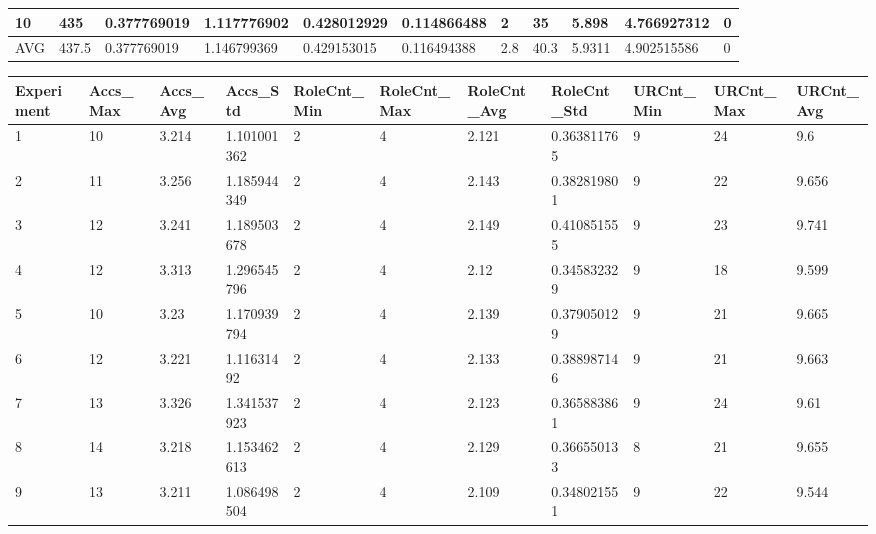 \begin{table}[H]
\begin{adjustbox}{max width=380pt,keepaspectratio,angle=90}
\begin{tabular}{|l|l|l|l|l|l|l|l|l|l|l|}
					10         & 435   & 0.377769019  & 1.117776902  & 0.428012929  & 0.114866488  & 2         & 35        & 5.898     & 4.766927312 & 0         \\ \hline\hline
					AVG        & 437.5 & 0.377769019  & 1.146799369  & 0.429153015  & 0.116494388  & 2.8       & 40.3      & 5.9311    & 4.902515586 & 0         \\ \hline
				\end{tabular}
			\end{adjustbox}
			\begin{adjustbox}{max width=380pt,keepaspectratio,angle=90}
				\begin{tabular}{|l|l|l|l|l|l|l|l|l|l|l|}
					\rowcolor[HTML]{EFEFEF} 
					\hline
					Experiment & Accs\_Max & Accs\_Avg & Accs\_Std   & RoleCnt\_Min & RoleCnt\_Max & RoleCnt\_Avg & RoleCnt\_Std & URCnt\_Min & URCnt\_Max & URCnt\_Avg \\ \hline
					1          & 10        & 3.214     & 1.101001362 & 2            & 4            & 2.121        & 0.363811765  & 9          & 24         & 9.6        \\ \hline
					2          & 11        & 3.256     & 1.185944349 & 2            & 4            & 2.143        & 0.382819801  & 9          & 22         & 9.656      \\ \hline
					3          & 12        & 3.241     & 1.189503678 & 2            & 4            & 2.149        & 0.410851555  & 9          & 23         & 9.741      \\ \hline
					4          & 12        & 3.313     & 1.296545796 & 2            & 4            & 2.12         & 0.345832329  & 9          & 18         & 9.599      \\ \hline
					5          & 10        & 3.23      & 1.170939794 & 2            & 4            & 2.139        & 0.379050129  & 9          & 21         & 9.665      \\ \hline
					6          & 12        & 3.221     & 1.11631492  & 2            & 4            & 2.133        & 0.388987146  & 9          & 21         & 9.663      \\ \hline
					7          & 13        & 3.326     & 1.341537923 & 2            & 4            & 2.123        & 0.365883861  & 9          & 24         & 9.61       \\ \hline
					8          & 14        & 3.218     & 1.153462613 & 2            & 4            & 2.129        & 0.366550133  & 8          & 21         & 9.655      \\ \hline
					9          & 13        & 3.211     & 1.086498504 & 2            & 4            & 2.109        & 0.348021551  & 9          & 22         & 9.544      \\ \hline

\end{tabular}
\end{adjustbox}
\end{table}
